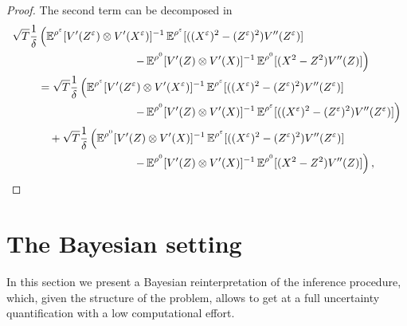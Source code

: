 \documentclass[10pt]{article}
\begin{document}
\begin{proof}
	
	
	 The second term can be decomposed in 
	\begin{equation}
	\begin{aligned}
	\sqrt{T} \frac1\delta & \left( \E^{\rho^\epl} [ V'(Z^\epl) \otimes V'(X^\epl) ]^{-1} \E^{\rho^\epl}[((X^\epl)^2 - (Z^\epl)^2)V''(Z^\epl)] \right. \\
	&\hspace{3cm} \left. - \E^{\rho^0} [ V'(Z) \otimes V'(X) ]^{-1} \E^{\rho^0}[(X^2 - Z^2)V''(Z)] \right) \\
	&= \sqrt{T} \frac1\delta \left( \E^{\rho^\epl} [ V'(Z^\epl) \otimes V'(X^\epl) ]^{-1} \E^{\rho^\epl}[((X^\epl)^2 - (Z^\epl)^2)V''(Z^\epl)] \right. \\
	&\hspace{3cm} \left. - \E^{\rho^0} [ V'(Z) \otimes V'(X) ]^{-1} \E^{\rho^\epl}[((X^\epl)^2 - (Z^\epl)^2)V''(Z^\epl)] \right) \\
	&\quad + \sqrt{T} \frac1\delta \left( \E^{\rho^0} [ V'(Z) \otimes V'(X) ]^{-1} \E^{\rho^\epl}[((X^\epl)^2 - (Z^\epl)^2)V''(Z^\epl)] \right. \\
	&\hspace{3cm} \left. - \E^{\rho^0} [ V'(Z) \otimes V'(X) ]^{-1} \E^{\rho^0}[(X^2 - Z^2)V''(Z)] \right), \\
	\end{aligned}
	\end{equation}
\end{proof}


\section{The Bayesian setting}\label{sec:Bayesian}

In this section we present a Bayesian reinterpretation of the inference procedure, which, given the structure of the problem, allows to get at a full uncertainty quantification with a low computational effort. 
\end{document}
